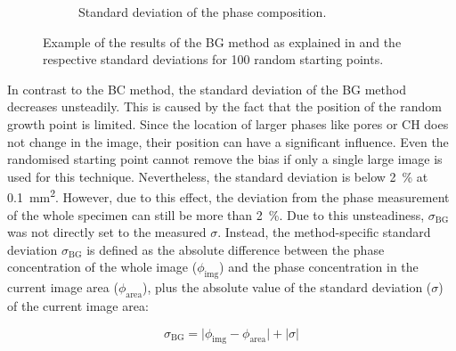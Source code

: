 \begin{figure}[H]
\begin{subfigure}[t]{0.49\linewidth}
      \caption{Standard deviation of the phase composition.}
      \label{fig:lit_box_growth_b}
    \end{subfigure}
    \caption{
        Example of the results of the \ac{BG} method as explained in \cite{bosl.1998,kameda.2006} and the respective standard deviations for \num{100} random starting points.
    }
    \label{fig:lit_box_growth}
\end{figure}

In contrast to the \ac{BC} method, the standard deviation of the \ac{BG} method decreases unsteadily.
This is caused by the fact that the position of the random growth point is limited.
Since the location of larger phases like pores or \ac{CH} does not change in the image, their position can have a significant influence.
Even the randomised starting point cannot remove the bias if only a single large image is used for this technique.
Nevertheless, the standard deviation is below \qty{2}{\percent} at \qty{0.1}{\square\milli\meter}.
However, due to this effect, the deviation from the phase measurement of the whole specimen can still be more than \qty{2}{\percent}.
Due to this unsteadiness, $\sigma_{\text{BG}}$ was not directly set to the measured $\sigma$.
Instead, the method-specific standard deviation $\sigma_{\text{BG}}$ is defined as the absolute difference between the phase concentration of the whole image ($\phi_{\text{img}}$) and the phase concentration in the current image area ($\phi_{\text{area}}$), plus the absolute value of the standard deviation ($\sigma$) of the current image area:

\begin{equation}
    \sigma_{\text{BG}} = \lvert\phi_{\text{img}} - \phi_{\text{area}} \rvert + \lvert\sigma\rvert
    \label{eq:phase_difference}
\end{equation}

